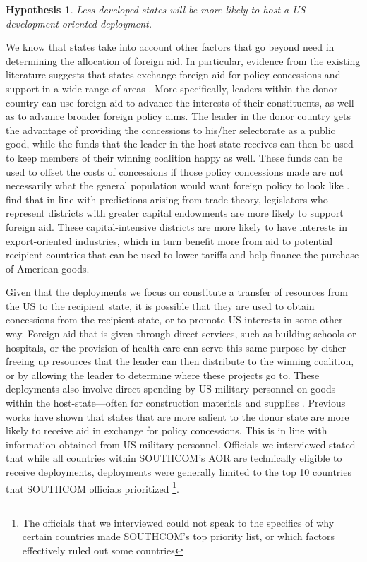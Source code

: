 \documentclass[12pt]{article}
\newtheorem{hyp}{Hypothesis}
\begin{document}
\begin{doublespace}
\begin{hyp}
Less developed states will be more likely to host a US development-oriented deployment.
\end{hyp}

We know that states take into account other factors that go beyond need in determining the allocation of foreign aid. In particular, evidence from the existing literature suggests that states exchange foreign aid for policy concessions and support in a wide range of areas \cite{LaiMorey2006,de2007foreign,Faye12,MilnerTingley2010,FleckKilby2006}. More specifically, leaders within the donor country can use foreign aid to advance the interests of their constituents, as well as to advance broader foreign policy aims. The leader in the donor country gets the advantage of providing the concessions to his/her selectorate as a public good, while the funds that the leader in the host-state receives can then be used to keep members of their winning coalition happy as well. These funds can be used to offset the costs of concessions if those policy concessions made are not necessarily what the general population would want foreign policy to look like \cite{de2007foreign}.  find that in line with predictions arising from trade theory, legislators who represent districts with greater capital endowments are more likely to support foreign aid. These capital-intensive districts are more likely to have interests in export-oriented industries, which in turn benefit more from aid to potential recipient countries that can be used to lower tariffs and help finance the purchase of American goods.    

Given that the deployments we focus on constitute a transfer of resources from the US to the recipient state, it is possible that they are used to obtain concessions from the recipient state, or to promote US interests in some other way. Foreign aid that is given through direct services, such as building schools or hospitals, or the provision of health care can serve this same purpose by either freeing up resources that the leader can then distribute to the winning coalition, or by allowing the leader to determine where these projects go to. These deployments also involve direct spending by US military personnel on goods within the host-state---often for construction materials and supplies \cite{CPT20160309,SFC20160226}. Previous works have shown that states that are more salient to the donor state are more likely to receive aid in exchange for policy concessions. This is in line with information obtained from US military personnel. Officials we interviewed stated that while all countries within SOUTHCOM's AOR are technically eligible to receive deployments, deployments were generally limited to the top 10 countries that SOUTHCOM officials prioritized \cite{CPT20160309}\footnote{The officials that we interviewed could not speak to the specifics of why certain countries made SOUTHCOM's top priority list, or which factors effectively ruled out some countries}.  


\end{doublespace}
\end{document}
